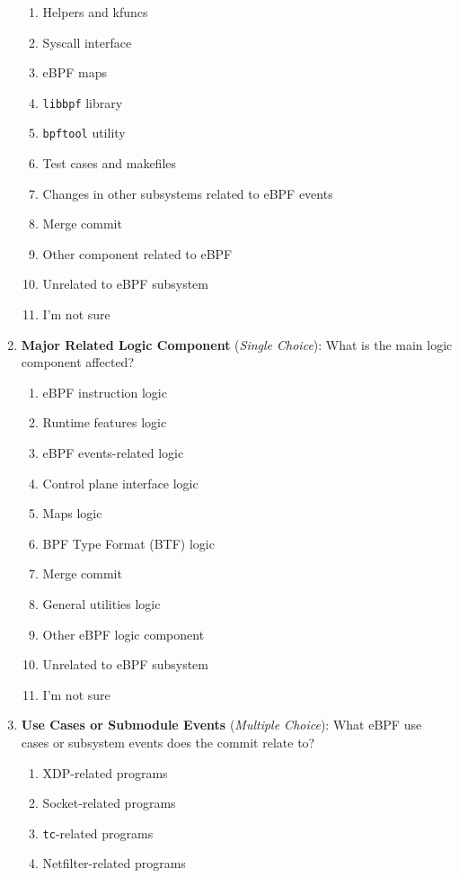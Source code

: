 \begin{enumerate}
\begin{enumerate}[label=(\alph*)]
        \item Helpers and kfuncs
        \item Syscall interface
        \item eBPF maps
        \item \texttt{libbpf} library
        \item \texttt{bpftool} utility
        \item Test cases and makefiles
        \item Changes in other subsystems related to eBPF events
        \item Merge commit
        \item Other component related to eBPF
        \item Unrelated to eBPF subsystem
        \item I'm not sure
    \end{enumerate}
    \item \textbf{Major Related Logic Component} (\emph{Single Choice}): What is the main logic component affected?
    \begin{enumerate}[label=(\alph*)]
        \item eBPF instruction logic
        \item Runtime features logic
        \item eBPF events-related logic
        \item Control plane interface logic
        \item Maps logic
        \item BPF Type Format (BTF) logic
        \item Merge commit
        \item General utilities logic
        \item Other eBPF logic component
        \item Unrelated to eBPF subsystem
        \item I'm not sure
    \end{enumerate}
    \item \textbf{Use Cases or Submodule Events} (\emph{Multiple Choice}): What eBPF use cases or subsystem events does the commit relate to?
    \begin{enumerate}[label=(\alph*)]
        \item XDP-related programs
        \item Socket-related programs
        \item \texttt{tc}-related programs
        \item Netfilter-related programs

\end{enumerate}
\end{enumerate}
